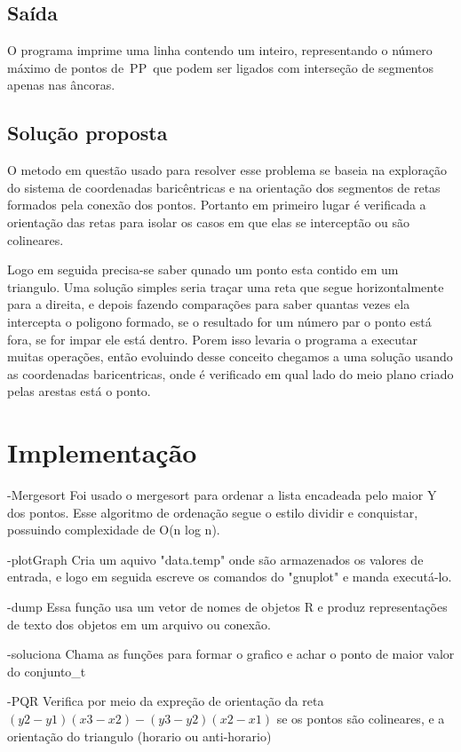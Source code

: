 \documentclass[12pt,a4paper]{article}
\begin{document}
\subsection{Saída}

O programa imprime uma linha contendo um inteiro, representando o número máximo de pontos de PP que podem ser ligados com interseção de segmentos apenas nas âncoras.

\subsection{Solução proposta}

O metodo em questão usado para resolver esse problema se baseia na exploração do sistema de coordenadas baricêntricas e na orientação dos segmentos de retas formados pela conexão dos pontos. Portanto em primeiro lugar é verificada a orientação das retas para isolar os casos em que elas se interceptão ou são colineares.

Logo em seguida precisa-se saber qunado um ponto esta contido em um triangulo. Uma solução simples seria traçar uma reta que segue horizontalmente para a direita, e depois fazendo comparações para saber quantas vezes ela intercepta o poligono formado, se o resultado for um número par o ponto está fora, se for impar ele está dentro. Porem isso levaria o programa a executar muitas operações, então evoluindo desse conceito chegamos a uma solução usando as coordenadas baricentricas, onde é verificado em qual lado do meio plano criado pelas arestas está o ponto.


\section{Implementação}

-Mergesort
Foi usado o mergesort para ordenar a lista encadeada pelo maior Y dos pontos. Esse algoritmo de ordenação segue o estilo dividir e conquistar, possuindo complexidade de O(n log n).

-plotGraph
Cria um aquivo "data.temp" onde são armazenados os valores de entrada, e logo em seguida escreve os comandos do "gnuplot" e manda executá-lo.

-dump 
Essa função usa um vetor de nomes de objetos R e produz representações de texto dos objetos em um arquivo ou conexão.

-soluciona
Chama as funções para formar o grafico e achar o ponto de maior valor do conjunto_t

-PQR
Verifica por meio da expreção de orientação da reta 
$(y2−y1) (x3−x2) − (y3−y2) (x2−x1)$
se os pontos são colineares, e a orientação do triangulo (horario ou anti-horario)
\end{document}

